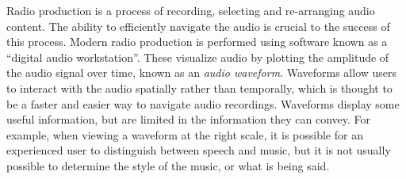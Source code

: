 
Radio production is a process of recording, selecting and re-arranging audio content. The ability to efficiently
navigate the audio is crucial to the success of this process.  Modern radio production is performed using software
known as a ``digital audio workstation''.  These visualize audio by plotting the amplitude of the audio signal over
time, known as an \textit{audio waveform}.  Waveforms allow users to interact with the audio spatially rather than
temporally, which is thought to be a faster and easier way to navigate audio recordings.  Waveforms display some useful
information, but are limited in the information they can convey.  For example, when viewing a waveform at the right
scale, it is possible for an experienced user to distinguish between speech and music, but it is not usually possible
to determine the style of the music, or what is being said.




